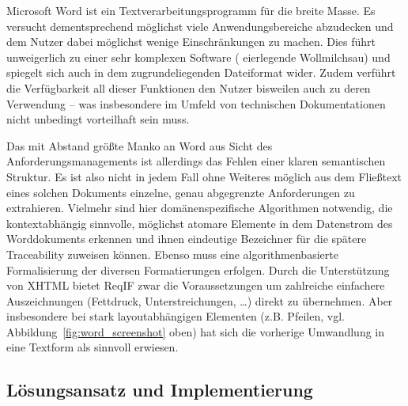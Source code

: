 \documentclass[twoside]{article}
\begin{document}
\begin{multicols}{2}
Microsoft Word ist ein Textverarbeitungsprogramm für die breite Masse. Es versucht dementsprechend möglichst viele Anwendungsbereiche abzudecken und dem Nutzer dabei möglichst wenige Einschränkungen zu machen. Dies führt unweigerlich zu einer sehr komplexen Software (\glqq{} eierlegende Wollmilchsau\grqq{}) und spiegelt sich auch in dem zugrundeliegenden Dateiformat wider. Zudem verführt die Verfügbarkeit all dieser Funktionen den Nutzer bisweilen auch zu deren Verwendung -- was insbesondere im Umfeld von technischen Dokumentationen nicht unbedingt vorteilhaft sein muss.

Das mit Abstand größte Manko an Word aus Sicht des Anforderungsmanagements ist allerdings das Fehlen einer klaren semantischen Struktur. Es ist also nicht in jedem Fall ohne Weiteres möglich aus dem Fließtext eines solchen Dokuments einzelne, genau abgegrenzte Anforderungen zu extrahieren. Vielmehr sind hier domänenspezifische Algorithmen notwendig, die kontextabhängig sinnvolle, möglichst atomare Elemente in dem Datenstrom des Worddokuments erkennen und ihnen eindeutige Bezeichner für die spätere Traceability zuweisen können. Ebenso muss eine algorithmenbasierte Formalisierung der diversen Formatierungen erfolgen. Durch die Unterstützung von XHTML bietet ReqIF zwar die Voraussetzungen um zahlreiche einfachere Auszeichnungen (Fettdruck, Unterstreichungen, \ldots{}) direkt zu übernehmen. Aber insbesondere bei stark layoutabhängigen Elementen (z.B. Pfeilen, vgl. Abbildung~\ref{fig:word_screenshot} oben) hat sich die vorherige Umwandlung in eine Textform als sinnvoll erwiesen.

\subsection{Lösungsansatz und Implementierung}



\end{multicols}
\end{document}
